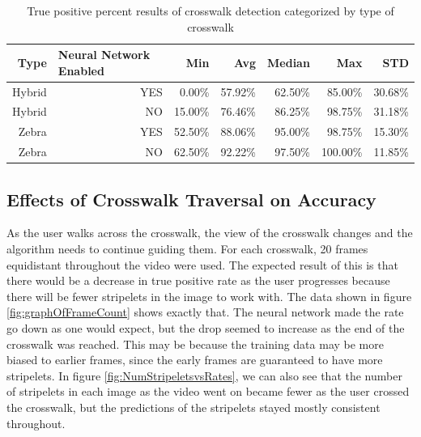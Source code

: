 \clearpage

\begin{table}[t]
    \begin{longtable}{|r|r|r|r|r|r|r|}
    \caption{True positive percent results of crosswalk detection categorized by type of crosswalk}
    \label{tab:typeOfCwalk}\\ 
    \hline
    Type  & \multicolumn{1}{l|}{Neural Network Enabled} & Min   & Avg   & Median & Max   & STD \bigstrut\\
    \hline
    Hybrid & YES   & 0.00\% & 57.92\% & 62.50\% & 85.00\% & 30.68\% \bigstrut\\
    \hline
    Hybrid & NO    & 15.00\% & 76.46\% & 86.25\% & 98.75\% & 31.18\% \bigstrut\\
    \hline
    Zebra & YES   & 52.50\% & 88.06\% & 95.00\% & 98.75\% & 15.30\% \bigstrut\\
    \hline
    Zebra & NO    & 62.50\% & 92.22\% & 97.50\% & 100.00\% & 11.85\% \bigstrut\\
    \hline
    \end{longtable}
\end{table}

\subsection{Effects of Crosswalk Traversal on Accuracy}

As the user walks across the crosswalk, the view of the crosswalk changes and the algorithm needs to continue guiding them. For each crosswalk, 20 frames equidistant throughout the video were used. The expected result of this is that there would be a decrease in true positive rate as the user progresses because there will be fewer stripelets in the image to work with. The data shown in figure \ref{fig:graphOfFrameCount} shows exactly that. The neural network made the rate go down as one would expect, but the drop seemed to increase as the end of the crosswalk was reached. This may be because the training data may be more biased to earlier frames, since the early frames are guaranteed to have more stripelets. In figure \ref{fig:NumStripeletsvsRates}, we can also see that the number of stripelets in each image as the video went on became fewer as the user crossed the crosswalk, but the predictions of the stripelets stayed mostly consistent throughout. 

